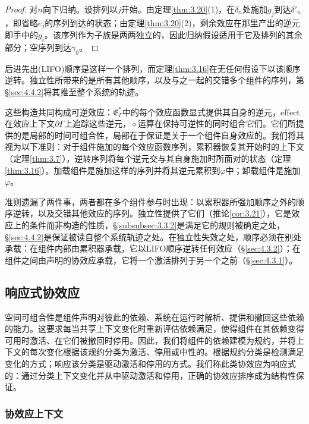 \begin{proof}
对$n$向下归纳。设排列以$j$开始。由定理\ref{thm:3.20}(1)，在$\delta_n$处施加$g_j$到达$\delta'_n$，即省略$e_j$的序列到达的状态；由定理\ref{thm:3.20}(2)，剩余效应在那里产出的逆元即手中的$g_i$。该序列作为子族是两两独立的，因此归纳假设适用于它及排列的其余部分；空序列到达$\gamma_0$。
\end{proof}

后进先出(LIFO)顺序是这样一个排列，而定理\ref{thm:3.16}在无任何假设下以该顺序逆转。独立性所带来的是所有其他顺序，以及与之一起的交错多个组件的序列，第\S\ref{sec:4.4.2}将其推至整个系统的轨迹。

这些构造共同构成可逆效应：$\mathfrak{E}^*_\Gamma$中的每个效应函数显式提供其自身的逆元，$\mathrm{effect}$在效应上下文$\partial\Gamma$上追踪这些逆元，$\diamond$运算在保持可逆性的同时组合它们。它们所提供的是局部的时间可组合性，局部在于保证是关于一个组件自身效应的。我们将其视为以下准则：对于组件施加的每个效应函数序列，累积器恢复其开始时的上下文（定理\ref{thm:3.7}），逆转序列将每个逆元交与其自身施加时所面对的状态（定理\ref{thm:3.16}）。加载组件是施加这样的序列并将其逆元累积到$\varphi$中；卸载组件是施加$\varphi$。

准则遗漏了两件事，两者都在多个组件参与时出现：以累积器所强加顺序之外的顺序逆转，以及交错其他效应的序列。独立性提供了它们（推论\ref{cor:3.21}），它是效应上的条件而非构造的性质，\S\ref{subsubsec:3.3.2}是满足它的规则被确定之处，\S\ref{sec:4.4.2}是保证被读自整个系统轨迹之处。在独立性失效之处，顺序必须在别处承载：在组件内部由累积器承载，它以LIFO顺序逆转任何效应（\S\ref{sec:4.3.2}）；在组件之间由声明的协效应承载，它将一个激活排列于另一个之前（\S\ref{sec:4.3.1}）。

\subsection{响应式协效应}\label{subsec:3.2}

空间可组合性是组件声明对彼此的依赖、系统在运行时解析、提供和撤回这些依赖的能力。这要求每当共享上下文变化时重新评估依赖满足，使得组件在其依赖变得可用时激活、在它们被撤回时停用。因此，我们将组件的依赖建模为规约，并将上下文的每次变化根据该规约分类为激活、停用或中性的。根据规约分类是检测满足变化的方式；响应该分类是驱动激活和停用的方式。我们称此类协效应为响应式的：通过分类上下文变化并从中驱动激活和停用，正确的协效应排序成为结构性保证。

\subsubsection{协效应上下文}\label{subsubsec:3.2.1}

